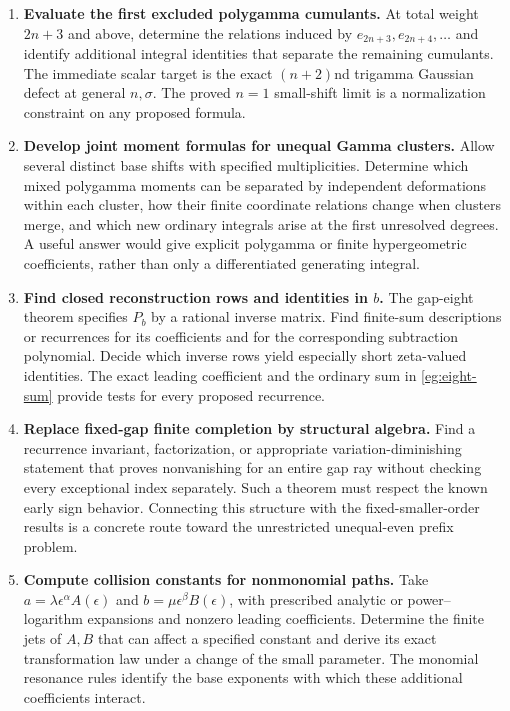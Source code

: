 \begin{enumerate}
\item \textbf{Evaluate the first excluded polygamma cumulants.}
At total weight $2n+3$ and above, determine the relations induced
by $e_{2n+3},e_{2n+4},\ldots$ and identify additional integral
identities that separate the remaining cumulants. The immediate
scalar target is the exact $(n+2)$nd trigamma Gaussian defect at
general $n,\sigma$. The proved $n=1$ small-shift limit is a
normalization constraint on any proposed formula.

\item \textbf{Develop joint moment formulas for unequal Gamma clusters.}
Allow several distinct base shifts with specified multiplicities.
Determine which mixed polygamma moments can be separated by
independent deformations within each cluster, how their finite
coordinate relations change when clusters merge, and which new
ordinary integrals arise at the first unresolved degrees. A useful
answer would give explicit polygamma or finite hypergeometric
coefficients, rather than only a differentiated generating integral.

\item \textbf{Find closed reconstruction rows and identities in $b$.}
The gap-eight theorem specifies $P_b$ by a rational inverse matrix.
Find finite-sum descriptions or recurrences for its coefficients and
for the corresponding subtraction polynomial. Decide which inverse
rows yield especially short zeta-valued identities. The exact
leading coefficient and the ordinary sum in
\eqref{eg:eight-sum} provide tests for every proposed recurrence.

\item \textbf{Replace fixed-gap finite completion by structural algebra.}
Find a recurrence invariant, factorization, or appropriate
variation-diminishing statement that proves nonvanishing for an
entire gap ray without checking every exceptional index separately.
Such a theorem must respect the known early sign behavior.
Connecting this structure with the fixed-smaller-order results is a
concrete route toward the unrestricted unequal-even prefix problem.

\item \textbf{Compute collision constants for nonmonomial paths.}
Take $a=\lambda\epsilon^\alpha A(\epsilon)$ and
$b=\mu\epsilon^\beta B(\epsilon)$, with prescribed analytic or
power--logarithm expansions and nonzero leading coefficients.
Determine the finite jets of $A,B$ that can affect a specified
constant and derive its exact transformation law under a change of
the small parameter. The monomial resonance rules identify the
base exponents with which these additional coefficients interact.


\end{enumerate}
